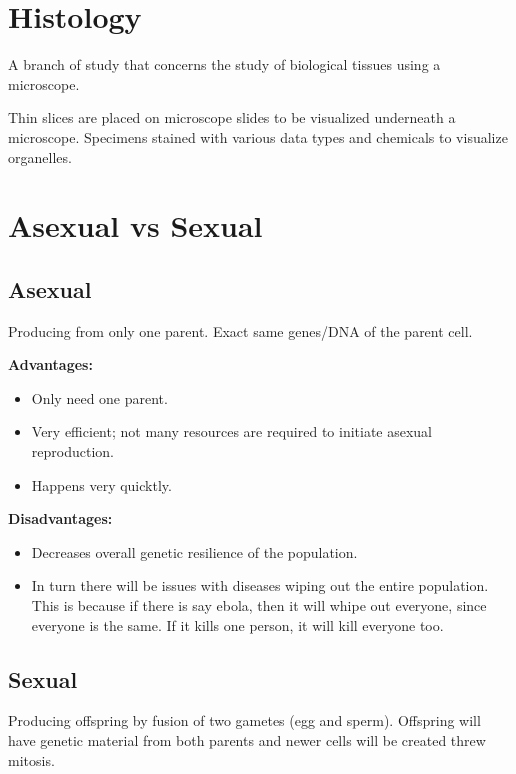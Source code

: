 \documentclass[12pt]{report}
\begin{document}
\section{Histology}
\begin{definition}[Histology]
    A branch of study that concerns the study of biological tissues using a microscope.
\end{definition}

Thin slices are placed on microscope slides to be visualized underneath a microscope. Specimens stained with various data types and chemicals to visualize organelles. 

\section{Asexual vs Sexual}
\subsection{Asexual}
\begin{definition}[Asexual]
    Producing from only one parent. Exact same genes/DNA of the parent cell.
\end{definition}

\textbf{Advantages:}
\begin{itemize}
    \item{Only need one parent.}
    \item{Very efficient; not many resources are required to initiate asexual reproduction.}
    \item{Happens very quicktly.}
\end{itemize}

\textbf{Disadvantages:}
\begin{itemize}
    \item{Decreases overall genetic resilience of the population.}
    \item{In turn there will be issues with diseases wiping out the entire population. This is because if there is say ebola, then it will whipe out everyone, since everyone is the same. If it kills one person, it will kill everyone too.}
\end{itemize}

\subsection{Sexual}
\begin{definition}[Sexual]
    Producing offspring by fusion of two gametes (egg and sperm). Offspring will have genetic material from both parents and newer cells will be created threw mitosis.
\end{definition}
\end{document}
